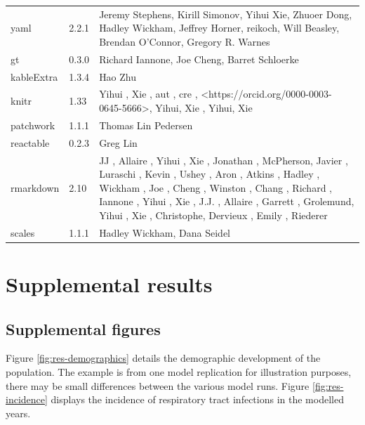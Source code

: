 \documentclass[
]{article}
\begin{document}
\begin{landscape}
\begin{longtable}[t]{lll}
\addlinespace
yaml & 2.2.1 & Jeremy Stephens, Kirill Simonov, Yihui Xie, Zhuoer Dong, Hadley Wickham, Jeffrey Horner, reikoch, Will Beasley, Brendan O'Connor, Gregory R. Warnes\\
gt & 0.3.0 & Richard Iannone, Joe Cheng, Barret Schloerke\\
kableExtra & 1.3.4 & Hao Zhu\\
knitr & 1.33 & Yihui                                  , Xie                                    , aut                                    , cre                                    , <https://orcid.org/0000-0003-0645-5666>, Yihui, Xie  , Yihui, Xie\\
patchwork & 1.1.1 & Thomas Lin Pedersen\\
\addlinespace
reactable & 0.2.3 & Greg Lin\\
rmarkdown & 2.10 & JJ       , Allaire  , Yihui    , Xie      , Jonathan , McPherson, Javier   , Luraschi , Kevin    , Ushey    , Aron     , Atkins   , Hadley   , Wickham  , Joe      , Cheng    , Winston  , Chang    , Richard  , Iannone  , Yihui    , Xie      , J.J.     , Allaire  , Garrett  , Grolemund, Yihui     , Xie       , Christophe, Dervieux  , Emily     , Riederer\\
scales & 1.1.1 & Hadley Wickham, Dana Seidel\\*
\end{longtable}
\endgroup{}
\end{landscape}

\newpage

\hypertarget{supplemental-results}{%
\section{Supplemental results}\label{supplemental-results}}

\hypertarget{supplemental-figures}{%
\subsection{Supplemental figures}\label{supplemental-figures}}

Figure \ref{fig:res-demographics} details the demographic development of the population. The example is from one model replication for illustration purposes, there may be small differences between the various model runs. Figure \ref{fig:res-incidence} displays the incidence of respiratory tract infections in the modelled years.
\end{document}
